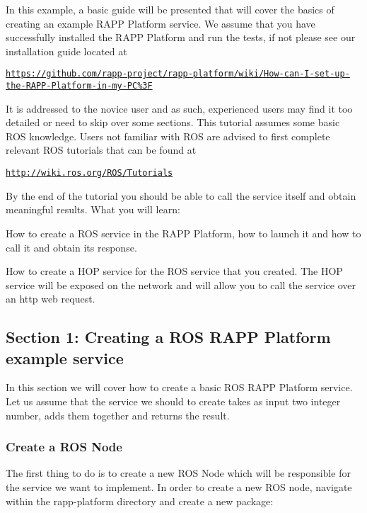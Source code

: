 In this example, a basic guide will be presented that will cover the basics of creating an example R\-A\-P\-P Platform service. We assume that you have successfully installed the R\-A\-P\-P Platform and run the tests, if not please see our installation guide located at

\href{https://github.com/rapp-project/rapp-platform/wiki/How-can-I-set-up-the-RAPP-Platform-in-my-PC%3F}{\tt https\-://github.\-com/rapp-\/project/rapp-\/platform/wiki/\-How-\/can-\/\-I-\/set-\/up-\/the-\/\-R\-A\-P\-P-\/\-Platform-\/in-\/my-\/\-P\-C\%3\-F}

It is addressed to the novice user and as such, experienced users may find it too detailed or need to skip over some sections. This tutorial assumes some basic R\-O\-S knowledge. Users not familiar with R\-O\-S are advised to first complete relevant R\-O\-S tutorials that can be found at

\href{http://wiki.ros.org/ROS/Tutorials}{\tt http\-://wiki.\-ros.\-org/\-R\-O\-S/\-Tutorials}

By the end of the tutorial you should be able to call the service itself and obtain meaningful results. What you will learn\-:


\begin{DoxyItemize}
\item How to create a R\-O\-S service in the R\-A\-P\-P Platform, how to launch it and how to call it and obtain its response.
\item How to create a H\-O\-P service for the R\-O\-S service that you created. The H\-O\-P service will be exposed on the network and will allow you to call the service over an http web request.
\end{DoxyItemize}

\subsection*{Section 1\-: Creating a R\-O\-S R\-A\-P\-P Platform example service}

In this section we will cover how to create a basic R\-O\-S R\-A\-P\-P Platform service. Let us assume that the service we should to create takes as input two integer number, adds them together and returns the result.

\subsubsection*{Create a R\-O\-S Node}

The first thing to do is to create a new R\-O\-S Node which will be responsible for the service we want to implement. In order to create a new R\-O\-S node, navigate within the rapp-\/platform directory and create a new package\-:

